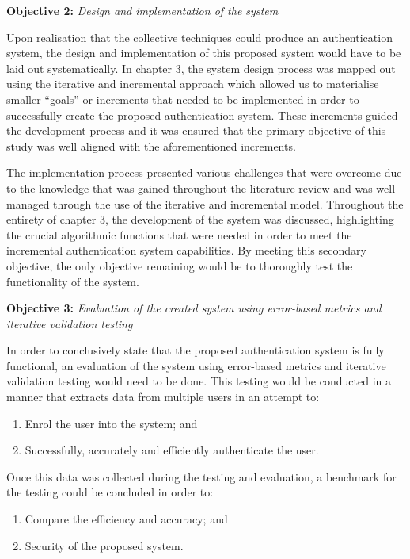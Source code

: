 \textbf{Objective 2:} \textit{Design and implementation of the system}


Upon realisation that the collective techniques could produce an authentication system, the design and implementation of this proposed system would have to be laid out systematically. In chapter 3, the system design process was mapped out using the iterative and incremental approach which allowed us to materialise smaller “goals” or increments that needed to be implemented in order to successfully create the proposed authentication system. These increments guided the development process and it was ensured that the primary objective of this study was well aligned with the aforementioned increments. 

The implementation process presented various challenges that were overcome due to the knowledge that was gained throughout the literature review and was well managed through the use of the iterative and incremental model. Throughout the entirety of chapter 3, the development of the system was discussed, highlighting the crucial algorithmic functions that were needed in order to meet the incremental authentication system capabilities. By meeting this secondary objective, the only objective remaining would be to thoroughly test the functionality of the system.


\textbf{Objective 3:} \textit{Evaluation of the created system using error-based metrics and iterative validation testing}


In order to conclusively state that the proposed authentication system is fully functional, an evaluation of the system using error-based metrics and iterative validation testing would need to be done. This testing would be conducted in a manner that extracts data from multiple users in an attempt to:

\begin{enumerate}[label=\roman*.]
    \item Enrol the user into the system; and
    \item Successfully, accurately and efficiently authenticate the user.
\end{enumerate}

Once this data was collected during the testing and evaluation, a benchmark for the testing could be concluded in order to: 

\begin{enumerate}[label=\roman*.]
    \item Compare the efficiency and accuracy; and 
    \item Security of the proposed system.
\end{enumerate}

